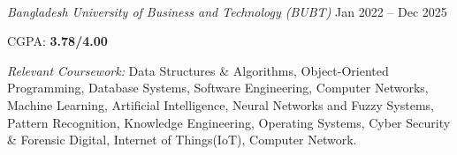 \\
\textit{Bangladesh University of Business and Technology (BUBT)} \hfill Jan 2022 -- Dec 2025

CGPA: \textbf{3.78/4.00}

\vspace{2pt}
\textit{Relevant Coursework:} Data Structures \& Algorithms, Object-Oriented Programming,  
Database Systems, Software Engineering, Computer Networks, Machine Learning,  
Artificial Intelligence, Neural Networks and Fuzzy Systems, Pattern Recognition, Knowledge Engineering, Operating Systems, Cyber Security \& Forensic Digital, Internet of Things(IoT), Computer Network.
